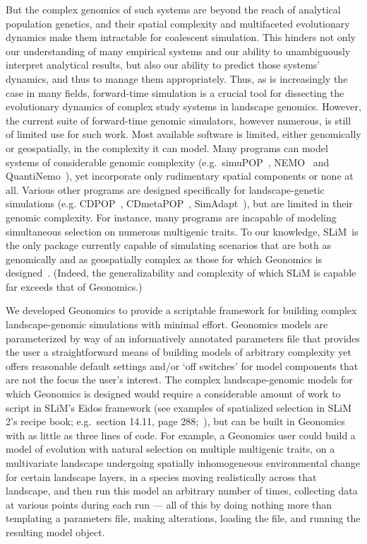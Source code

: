 ﻿\documentclass{article}
\begin{document}
But the complex genomics of such systems are beyond the reach of analytical
population genetics, and their spatial complexity and multifaceted evolutionary
dynamics make them intractable for coalescent simulation.
This hinders not only our understanding of many empirical systems and our ability to
unambiguously interpret analytical results, but also our
ability to predict those systems' dynamics, and thus to manage them appropriately.
Thus, as is increasingly the case in many fields, forward-time simulation is a 
crucial tool for dissecting the evolutionary dynamics of complex study systems in landscape genomics.
However, the current suite of forward-time genomic simulators, however numerous, is still of limited use for such work.
Most available software is limited, either genomically or geospatially, in the complexity it can model.
Many programs can model systems of considerable genomic complexity
(e.g.\ simuPOP~\cite{peng}, NEMO~\cite{guillaume} and QuantiNemo~\cite{neuenschwander}),
yet incorporate only rudimentary spatial components or none at all.
Various other programs are designed specifically for landscape-genetic simulations
(e.g. CDPOP~\cite{landguth}, CDmetaPOP~\cite{landguth2}, SimAdapt~\cite{rebaudo}),
but are limited in their genomic complexity.
For instance, many programs are incapable of modeling simultaneous selection on numerous multigenic traits.
To our knowledge, SLiM~\cite{messer,haller}is the only package currently capable of simulating scenarios
that are both as genomically and as geospatially complex as those for which Geonomics is designed~\cite{popgen_models}.
(Indeed, the generalizability and complexity of which SLiM is capable far exceeds that of Geonomics.)

We developed Geonomics to provide a scriptable framework for building
complex landscape-genomic simulations with minimal effort.
Geonomics models are parameterized by way of an informatively annotated parameters file
that provides the user a straightforward means of building models of arbitrary complexity yet offers
reasonable default settings and/or `off switches' for model components that are not the focus the user's interest.
The complex landscape-genomic models for which Geonomics is designed would require a considerable amount
of work to script in SLiM's Eidos framework (see examples of spatialized selection in SLiM 2's recipe book;
e.g.\ section 14.11, page 288;~\cite{slim_manual}), but can be built in Geonomics with as little as three lines of code.
For example, a Geonomics user could build a model of evolution with natural selection
on multiple multigenic traits, on a multivariate landscape undergoing spatially inhomogeneous
environmental change for certain landscape layers, in a species moving realistically across that landscape,
and then run this model an arbitrary number of times, collecting data at various points during each
run --- all of this by doing nothing more than templating a parameters file, making alterations,
loading the file, and running the resulting model object.
\end{document}

